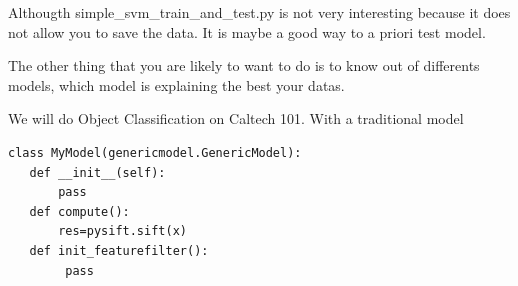 \documentclass{report}
\begin{document}
Althougth simple_svm_train_and_test.py is not very interesting because it does not allow you to save the data. It is maybe a good way
to a priori test model.



The other thing that you are likely to want to do is to know out of differents models, which model is explaining the best your datas.


We will do Object Classification on Caltech 101.
With a traditional model






\begin{lstlisting}
class MyModel(genericmodel.GenericModel):
   def __init__(self):
       pass
   def compute():
       res=pysift.sift(x)
   def init_featurefilter():
        pass

\end{lstlisting}
\end{document}
